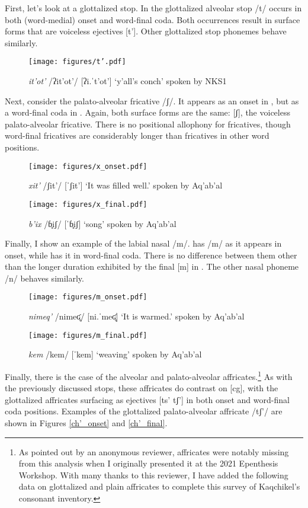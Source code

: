 \documentclass[output=paper,colorlinks,citecolor=brown]{langscibook}
\begin{document}
First, let’s look at a glottalized stop. In  the glottalized alveolar stop /t/ occurs in both (word-medial) onset and word-final coda. Both occurrences result in surface forms that are voiceless ejectives [t’]. Other glottalized stop phonemes behave similarly.
\newpage

\begin{figure}
\texttt{[image: figures/t'.pdf]}
\caption{ \emph{it’ot’} /ʔit’ot’/ [ʔi.ˈt’ot’] ‘y’all’s conch’ spoken by NKS1}
\label{t’}
\end{figure}

Next, consider the palato-alveolar fricative /ʃ/. It appears as an onset in , but as a word-final coda in . Again, both surface forms are the same: [ʃ], the voiceless palato-alveolar fricative. There is no positional allophony for fricatives, though word-final fricatives are considerably longer than fricatives in other word positions.

\begin{figure}
\texttt{[image: figures/x\_onset.pdf]}
\caption{\emph{xit’} /ʃit’/ [ˈʃit’] ‘It was filled well.’ spoken by Aq’ab’al}
\label{x_onset}
\end{figure}

\begin{figure}
\texttt{[image: figures/x\_final.pdf]}
\caption{\emph{b’ix} /ɓ̥iʃ/ [ˈɓ̥iʃ] ‘song’ spoken by Aq’ab’al}
\label{x_final}
\end{figure}

Finally, I show an example of the labial nasal /m/.  has /m/ as it appears in onset, while  has it in word-final coda. There is no difference between them other than the longer duration exhibited by the final [m] in . The other nasal phoneme /n/ behaves similarly.

\begin{figure}
\texttt{[image: figures/m\_onset.pdf]}
\caption{\emph{nimeq’} /nimeʛ̥/ [ni.ˈmeʛ̥] ‘It is warmed.’ spoken by Aq’ab’al}
\label{m_onset}
\end{figure}

\begin{figure}
\texttt{[image: figures/m\_final.pdf]}
\caption{ \emph{kem} /kem/ [ˈkem] ‘weaving’ spoken by Aq’ab’al}
\label{m_final}
\end{figure}

Finally, there is the case of the alveolar and palato-alveolar affricates.\footnote{As pointed out by an anonymous reviewer, affricates were notably missing from this analysis when I originally presented it at the 2021 Epenthesis Workshop. With many thanks to this reviewer, I have added the following data on glottalized and plain affricates to complete this survey of Kaqchikel's consonant inventory.} As with the previously discussed stops, these affricates do contrast on [cg], with the glottalized affricates surfacing as ejectives [ts’ tʃ’] in both onset and word-final coda positions. Examples of the glottalized palato-alveolar affricate /tʃ’/ are shown in Figures \ref{ch’_onset} and \ref{ch’_final}.
\end{document}
